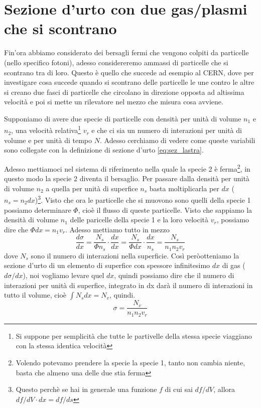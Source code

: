 \documentclass[11pt,a4paper]{report}
\begin{document}
	\section{Sezione d'urto con due gas/plasmi che si scontrano}
		\label{sec:gas}
		Fin'ora abbiamo considerato dei bersagli fermi che vengono colpiti da particelle (nello specifico fotoni), adesso considereremo ammassi di particelle che si scontrano tra di loro.\newline
		Questo è quello che succede ad esempio al CERN, dove per investigare cosa succede quando si scontrano delle particelle le une contro le altre si creano due fasci di particelle che circolano in direzione opposta ad altissima velocità e poi si mette un rilevatore nel mezzo che misura cosa avviene.\newline

		Supponiamo di avere due specie di particelle con densità per unità di volume $n_1$ e $n_2$, una velocità relativa\footnote{Si suppone per semplicità che tutte le partivelle della stessa specie viaggiano con la stessa identica velocità} $v_r$ e che ci sia un numero di interazioni per unità di volume e per unità di tempo $N$.\newline
		Adesso cerchiamo di vedere come queste variabili sono collegate con la definizione di sezione d'urto \ref{eq:sez_lastra}.\newline

		Adesso mettiamoci nel sistema di riferimento nella quale la specie 2 è ferma\footnote{Volendo potevamo prendere la specie la specie 1, tanto non cambia niente, basta che almeno una delle due stia ferma}, in questo modo la specie 2 diventa il bersaglio.\newline
		Per passare dalla densità per unità di volume $n_2$ a quella per unità di superfice $n_s$ basta moltiplicarla per $dx$ ($n_s=n_2dx$)\footnote{Questo perchè se hai in generale una funzione $f$ di cui sai $df/dV$, allora $df/dV\cdot dx=df/ds$}.\newline
		Visto che ora le particelle che si muovono sono quelli della specie 1 possiamo determinare $\Phi$, cioè il flusso di queste particelle. Visto che sappiamo la densità di volume $n_1$ delle paricelle della specie 1 e la loro velocità $v_r$, possiamo dire che $\Phi dx=n_1v_r$. Adesso mettiamo tutto in mezzo\newline
		\[
			\frac{d\sigma}{dx}=\frac{N_s}{\Phi n_s}\cdot\frac{dx}{dx}=\frac{N_s}{\Phi dx}\cdot\frac{dx}{n_s}=\frac{N_s}{n_1n_2v_r}
		\]
		dove $N_s$ sono il numero di interazioni nella superficie.\newline
		Così  peròotteniamo la sezione d'urto di un elemento di superfice con spessore infinitesimo $dx$ di gas ($d\sigma/dx$), noi vogliamo levare quel $dx$, quindi possiamo dire che il numero di interazioni per unità di superfice, integrato in dx darà il numero di interazioni in tutto il volume, cioè $\int N_sdx=N_v$, quindi.
		\begin{equation}
			\sigma=\frac{N_v}{n_1n_2v_r}
			\label{eq:gas}
		\end{equation} 
\end{document}
